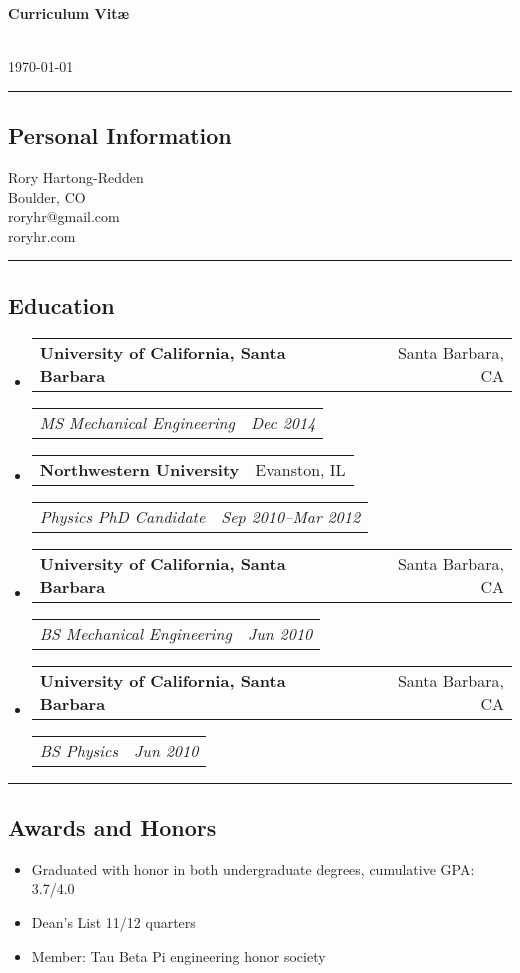 \documentclass[10pt,letterpaper]{article}
\makeatletter
\newenvironment{indentsection}[1]%
{\begin{list}{}%
	{\setlength{\leftmargin}{#1}}%
	\item[]%
}
{\end{list}}
\newcommand{\headerrow}[2]
	{\begin{tabular*}{\linewidth}{l@{\extracolsep{\fill}}r}
	#1 & #2 
	 \end{tabular*}}
\newcommand{\jobitem}[4]{
	\item \headerrow{\textbf{#1}}{#2}
	\headerrow{\emph{#3}}{\emph{#4}}
}
\makeatother
\begin{document}
{\raggedright \LARGE \bf Curriculum Vit\ae}\\
\today
\newline
\hrule
\subsection*{Personal Information}
\begin{indentsection}{\parindent}
Rory Hartong-Redden \\
Boulder, CO   \\
roryhr@gmail.com \\
roryhr.com
\end{indentsection}

\hrule
\subsection*{Education}
\begin{itemize}
	\jobitem{University of California, Santa Barbara}	{Santa Barbara, CA}
			{MS  Mechanical Engineering}			{Dec 2014}
	\jobitem{Northwestern University}					{Evanston, IL}
		    {Physics PhD Candidate}					{Sep 2010--Mar 2012}
	\jobitem{University of California, Santa Barbara}	{Santa Barbara, CA}	
			{BS Mechanical Engineering} 				{Jun 2010}
	\jobitem{University of California, Santa Barbara}	{Santa Barbara, CA}	
			{BS Physics} 								{Jun 2010}
\end{itemize}

\hrule
\subsection*{Awards and Honors}
\begin{indentsection}{\parindent}
	\begin{itemize}
		\parskip=-0.1em
		\item Graduated with honor in both undergraduate degrees, cumulative GPA: 3.7/4.0
		\item Dean's List 11/12 quarters
		\item Member: Tau Beta Pi engineering honor society
	\end{itemize}
\end{indentsection}
\end{document}
